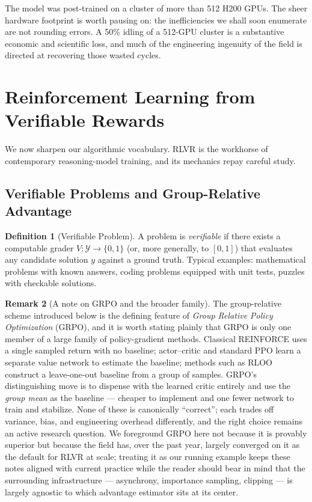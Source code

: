 \documentclass[11pt,a4paper]{article}
\theoremstyle{definition}
\newtheorem{definition}{Definition}[section]
\newtheorem{remark}[definition]{Remark}
\theoremstyle{plain}
\begin{document}
The model was post-trained on a cluster of more than 512 H200 GPUs. The sheer hardware footprint is worth pausing on: the inefficiencies we shall soon enumerate are not rounding errors. A 50\% idling of a 512-GPU cluster is a substantive economic and scientific loss, and much of the engineering ingenuity of the field is directed at recovering those wasted cycles.

\section{Reinforcement Learning from Verifiable Rewards}

We now sharpen our algorithmic vocabulary. RLVR is the workhorse of contemporary reasoning-model training, and its mechanics repay careful study.

\subsection{Verifiable Problems and Group-Relative Advantage}

\begin{definition}[Verifiable Problem]
A problem is \emph{verifiable} if there exists a computable grader $V: \mathcal{Y} \to \{0,1\}$ (or, more generally, to $[0,1]$) that evaluates any candidate solution $y$ against a ground truth. Typical examples: mathematical problems with known answers, coding problems equipped with unit tests, puzzles with checkable solutions.
\end{definition}

\begin{remark}[A note on GRPO and the broader family]
The group-relative scheme introduced below is the defining feature of
\emph{Group Relative Policy Optimization} (GRPO), and it is worth stating
plainly that GRPO is only one member of a large family of policy-gradient
methods. Classical REINFORCE uses a single sampled return with no baseline;
actor--critic and standard PPO learn a separate value network to estimate the
baseline; methods such as RLOO construct a leave-one-out baseline from a group
of samples. GRPO's distinguishing move is to dispense with the learned critic
entirely and use the \emph{group mean} as the baseline --- cheaper to
implement and one fewer network to train and stabilize. None of these is
canonically ``correct''; each trades off variance, bias, and engineering
overhead differently, and the right choice remains an active research
question. We foreground GRPO here not because it is provably superior but
because the field has, over the past year, largely converged on it as the
default for RLVR at scale; treating it as our running example keeps these
notes aligned with current practice while the reader should bear in mind that
the surrounding infrastructure --- asynchrony, importance sampling, clipping
--- is largely agnostic to which advantage estimator sits at its center.
\end{remark}
\end{document}
